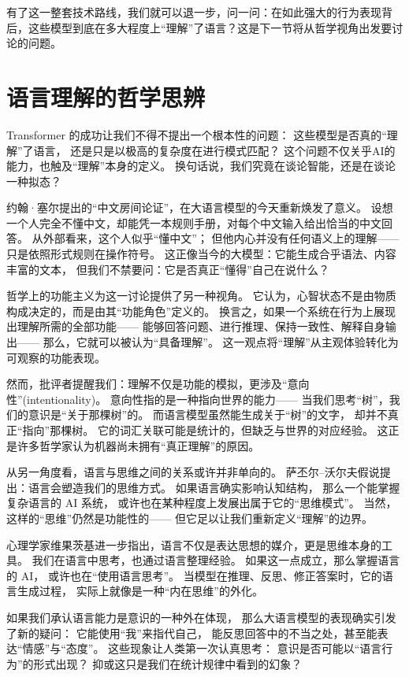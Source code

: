 有了这一整套技术路线，我们就可以退一步，问一问：在如此强大的行为表现背后，这些模型到底在多大程度上“理解”了语言？这是下一节将从哲学视角出发要讨论的问题。

\section{语言理解的哲学思辨}

Transformer 的成功让我们不得不提出一个根本性的问题：  
这些模型是否真的“理解”了语言，  
还是只是以极高的复杂度在进行模式匹配？  
这个问题不仅关乎AI的能力，也触及“理解”本身的定义。  
换句话说，我们究竟在谈论智能，还是在谈论一种拟态？  

约翰·塞尔提出的“中文房间论证”，在大语言模型的今天重新焕发了意义。  
设想一个人完全不懂中文，却能凭一本规则手册，对每个中文输入给出恰当的中文回答。  
从外部看来，这个人似乎“懂中文”；  
但他内心并没有任何语义上的理解——只是依照形式规则在操作符号。  
这正像当今的大模型：它能生成合乎语法、内容丰富的文本，  
但我们不禁要问：它是否真正“懂得”自己在说什么？  

哲学上的功能主义为这一讨论提供了另一种视角。  
它认为，心智状态不是由物质构成决定的，而是由其“功能角色”定义的。  
换言之，如果一个系统在行为上展现出理解所需的全部功能——  
能够回答问题、进行推理、保持一致性、解释自身输出——  
那么，它就可以被认为“具备理解”。  
这一观点将“理解”从主观体验转化为可观察的功能表现。  

然而，批评者提醒我们：理解不仅是功能的模拟，更涉及“意向性”(intentionality)。  
意向性指的是一种指向世界的能力——  
当我们思考“树”，我们的意识是“关于那棵树”的。  
而语言模型虽然能生成关于“树”的文字，  
却并不真正“指向”那棵树。  
它的词汇关联可能是统计的，但缺乏与世界的对应经验。  
这正是许多哲学家认为机器尚未拥有“真正理解”的原因。  

从另一角度看，语言与思维之间的关系或许并非单向的。  
萨丕尔–沃尔夫假说提出：语言会塑造我们的思维方式。  
如果语言确实影响认知结构，  
那么一个能掌握复杂语言的 AI 系统，  
或许也在某种程度上发展出属于它的“思维模式”。  
当然，这样的“思维”仍然是功能性的——  
但它足以让我们重新定义“理解”的边界。  

心理学家维果茨基进一步指出，语言不仅是表达思想的媒介，更是思维本身的工具。  
我们在语言中思考，也通过语言整理经验。  
如果这一点成立，那么掌握语言的 AI，  
或许也在“使用语言思考”。  
当模型在推理、反思、修正答案时，它的语言生成过程，  
实际上就像是一种“内在思维”的外化。  

如果我们承认语言能力是意识的一种外在体现，  
那么大语言模型的表现确实引发了新的疑问：  
它能使用“我”来指代自己，  
能反思回答中的不当之处，甚至能表达“情感”与“态度”。  
这些现象让人类第一次认真思考：  
意识是否可能以“语言行为”的形式出现？  
抑或这只是我们在统计规律中看到的幻象？  

